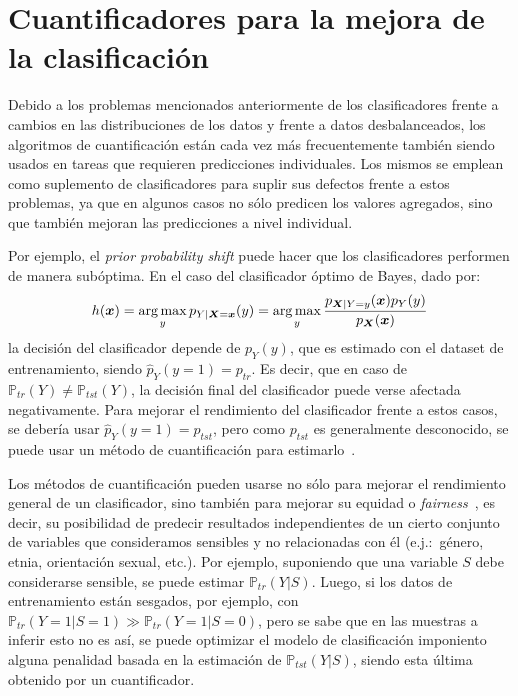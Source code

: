 \section{Cuantificadores para la mejora de la
clasificación}\label{problema:mejora}

Debido a los problemas mencionados anteriormente de los clasificadores frente a
cambios en las distribuciones de los datos y frente a datos desbalanceados, los
algoritmos de cuantificación están cada vez más frecuentemente también siendo
usados en tareas que requieren predicciones individuales. Los mismos se emplean
como suplemento de clasificadores para suplir sus defectos frente a estos
problemas, ya que en algunos casos no sólo predicen los valores agregados, sino
que también mejoran las predicciones a nivel individual.

Por ejemplo, el {\it prior probability shift\/} puede hacer que los
clasificadores performen de manera subóptima. En el caso del clasificador óptimo
de Bayes, dado por:
\begin{equation}\label{ecuacion:bayes}
    h(\boldsymbol{x}) = \operatorname*{arg\,max}_{y} p_{Y|\boldsymbol{X}=\boldsymbol{x}}(y) = \operatorname*{arg\,max}_{y} \frac{p_{\boldsymbol{X}|Y=y}(\boldsymbol{x})p_Y(y)}{p_{\boldsymbol{X}}(\boldsymbol{x})}
\end{equation}
la decisión del clasificador depende de $p_Y(y)$, que es estimado con el dataset
de entrenamiento, siendo $\hat p_Y(y=1) = p_{tr}$. Es decir, que en caso de
$\mathbb{P}_{tr}(Y) \neq \mathbb{P}_{tst}(Y)$, la decisión final del
clasificador puede verse afectada negativamente. Para mejorar el rendimiento del
clasificador frente a estos casos, se debería usar $\hat p_Y(y=1) = p_{tst}$,
pero como $p_{tst}$ es generalmente desconocido, se puede usar un método de
cuantificación para estimarlo~\cite{saerens2002adjusting, alaiz2011class,
zhang2010transfer, xue2009quantification}.

Los métodos de cuantificación pueden usarse no sólo para mejorar el rendimiento
general de un clasificador, sino también para mejorar su equidad o {\it
fairness\/}~\cite{biswas2021ensuring}, es decir, su posibilidad de predecir
resultados independientes de un cierto conjunto de variables que consideramos
sensibles y no relacionadas con él (e.j.:~género, etnia, orientación sexual,
etc.). Por ejemplo, suponiendo que una variable $S$ debe considerarse sensible,
se puede estimar $\mathbb{P}_{tr}(Y|S)$. Luego, si los datos de entrenamiento
están sesgados, por ejemplo, con $\mathbb{P}_{tr}(Y=1|S=1) \gg
\mathbb{P}_{tr}(Y=1|S=0)$, pero se sabe que en las muestras a inferir esto no es
así, se puede optimizar el modelo de clasificación imponiento alguna penalidad
basada en la estimación de $\mathbb{P}_{tst}(Y|S)$, siendo esta última obtenido
por un cuantificador.
